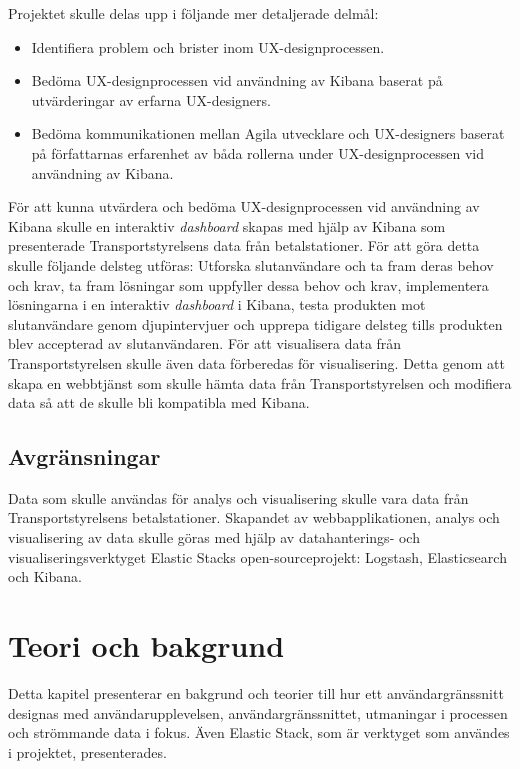 \documentclass[12pt]{kththesis}
\begin{document}
Projektet skulle delas upp i följande mer detaljerade delmål:

\begin{itemize}

\item Identifiera problem och brister inom UX-designprocessen. 

\item Bedöma UX-designprocessen vid användning av Kibana baserat på utvärderingar av erfarna UX-designers.

\item Bedöma kommunikationen mellan Agila utvecklare och UX-designers baserat på författarnas erfarenhet av båda rollerna under UX-designprocessen vid användning av Kibana.
\end{itemize} 

För att kunna utvärdera och bedöma UX-designprocessen vid användning av Kibana skulle en interaktiv \textit{dashboard} skapas med hjälp av Kibana som presenterade Transportstyrelsens data från betalstationer. För att göra detta skulle följande delsteg utföras: Utforska slutanvändare och ta fram deras behov och krav, ta fram lösningar som uppfyller dessa behov och krav, implementera lösningarna i en interaktiv \textit{dashboard} i Kibana, testa produkten mot slutanvändare genom djupintervjuer och upprepa tidigare delsteg tills produkten blev accepterad av slutanvändaren. För att visualisera data från Transportstyrelsen skulle även data förberedas för visualisering. Detta genom att skapa en webbtjänst som skulle hämta data från Transportstyrelsen och modifiera data så att de skulle bli kompatibla med Kibana.

\section{Avgränsningar}
Data som skulle användas för analys och visualisering skulle vara data från Transportstyrelsens betalstationer. Skapandet av webbapplikationen, analys och visualisering av data skulle göras med hjälp av datahanterings- och visualiseringsverktyget Elastic Stacks open-sourceprojekt: Logstash, Elasticsearch och Kibana. 

\chapter{Teori och bakgrund}

Detta kapitel presenterar en bakgrund och teorier till hur ett användargränssnitt designas med användarupplevelsen, användargränssnittet, utmaningar i processen och strömmande data i fokus. Även Elastic Stack, som är verktyget som användes i projektet, presenterades.
\end{document}
